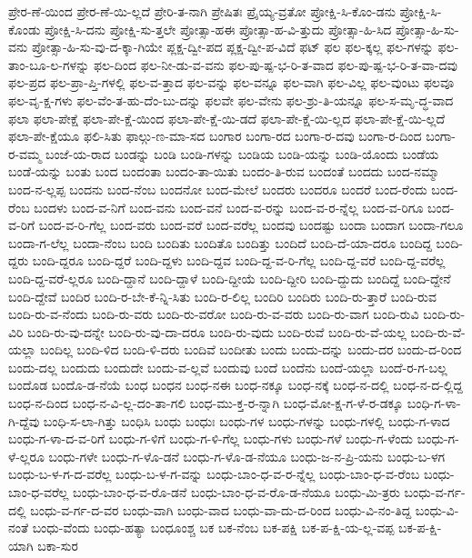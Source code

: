 {ಪ್ರೇರ-ಣೆ-ಯಿಂದ
ಪ್ರೇರ-ಣೆ-ಯಿ-ಲ್ಲದೆ
ಪ್ರೇರಿ-ತ-ನಾಗಿ
ಪ್ರೇಷಿತಃ
ಪ್ರೈಯ್ಯ-ವ್ರತೋ
ಪ್ರೋಕ್ಷಿ-ಸಿ-ಕೊಂ-ಡನು
ಪ್ರೋಕ್ಷಿ-ಸಿ-ಕೊಂಡು
ಪ್ರೋಕ್ಷಿ-ಸಿ-ದನು
ಪ್ರೋಕ್ಷಿ-ಸು-ತ್ತಲೇ
ಪ್ರೋತ್ಸಾ-ಹಈ
ಪ್ರೋತ್ಸಾ-ಹ-ವಿ-ತ್ತುದು
ಪ್ರೋತ್ಸಾ-ಹಿ-ಸಿದ
ಪ್ರೋತ್ಸಾ-ಹಿ-ಸು-ವನು
ಪ್ರೋತ್ಸಾ-ಹಿ-ಸು-ವು-ದ-ಕ್ಕಾ-ಗಿಯೇ
ಪ್ಲಕ್ಷ-ದ್ವೀ-ಪದ
ಪ್ಲಕ್ಷ-ದ್ವೀ-ಪ-ವಿದೆ
ಫಟ್
ಫಲ
ಫಲ-ಕ್ಕಲ್ಲ
ಫಲ-ಗಳನ್ನು
ಫಲ-ತಾಂ-ಬೂ-ಲ-ಗಳನ್ನು
ಫಲ-ದಿಂದ
ಫಲ-ನೀ-ಡು-ವ-ವನು
ಫಲ-ಪು-ಷ್ಪ-ಭ-ರಿ-ತ-ವಾದ
ಫಲ-ಪು-ಷ್ಪ-ಭ-ರಿ-ತ-ವಾ-ದವು
ಫಲ-ಪ್ರದ
ಫಲ-ಪ್ರಾ-ಪ್ತಿ-ಗಳಲ್ಲಿ
ಫಲ-ವ-ತ್ತಾದ
ಫಲ-ವನ್ನು
ಫಲ-ವನ್ನೂ
ಫಲ-ವಾಗಿ
ಫಲ-ವಿಲ್ಲ
ಫಲ-ವುಂಟು
ಫಲವೂ
ಫಲ-ವೃ-ಕ್ಷ-ಗಳು
ಫಲ-ವೆಂ-ತ-ಹು-ದೆಂ-ಬು-ದನ್ನು
ಫಲವೇ
ಫಲ-ವೇನು
ಫಲ-ಶ್ರು-ತಿ-ಯನ್ನೂ
ಫಲ-ಸ-ಮೃ-ದ್ಧ-ವಾದ
ಫಲಾ
ಫಲಾ-ಪೇಕ್ಷೆ
ಫಲಾ-ಪೇ-ಕ್ಷೆ-ಯಿಂದ
ಫಲಾ-ಪೇ-ಕ್ಷೆ-ಯಿ-ಡದೆ
ಫಲಾ-ಪೇ-ಕ್ಷೆ-ಯಿ-ಲ್ಲದ
ಫಲಾ-ಪೇ-ಕ್ಷೆ-ಯಿ-ಲ್ಲದೆ
ಫಲಾ-ಪೇ-ಕ್ಷೆಯೂ
ಫಲಿ-ಸಿತು
ಫಾಲ್ಗು-ಣ-ಮಾ-ಸದ
ಬಂಗಾರ
ಬಂಗಾ-ರದ
ಬಂಗಾ-ರ-ದವು
ಬಂಗಾ-ರ-ದಿಂದ
ಬಂಗಾ-ರ-ವಮ್ಮ
ಬಂಜೆ-ಯ-ರಾದ
ಬಂಡನ್ನು
ಬಂಡಿ
ಬಂಡಿ-ಗಳನ್ನು
ಬಂಡಿಯ
ಬಂಡಿ-ಯನ್ನು
ಬಂಡಿ-ಯೊಂದು
ಬಂಡೆಯ
ಬಂಡೆ-ಯನ್ನು
ಬಂತು
ಬಂದ
ಬಂದಂತಾ
ಬಂದಂ-ತಾ-ಯಿತು
ಬಂದಂ-ತಿ-ರುವ
ಬಂದಂತೆ
ಬಂದದು
ಬಂದ-ನಮ್ಮಾ
ಬಂದ-ನ-ಲ್ಲಪ್ಪ
ಬಂದನು
ಬಂದ-ನೆಂಬ
ಬಂದನೋ
ಬಂದ-ಮೇಲೆ
ಬಂದರು
ಬಂದರೂ
ಬಂದರೆ
ಬಂದ-ರೆಂದು
ಬಂದ-ರೆಂಬ
ಬಂದಳು
ಬಂದ-ವ-ನಿಗೆ
ಬಂದ-ವನು
ಬಂದ-ವನೆ
ಬಂದ-ವ-ರನ್ನು
ಬಂದ-ವ-ರ-ನ್ನೆಲ್ಲ
ಬಂದ-ವ-ರಿಗೂ
ಬಂದ-ವ-ರಿಗೆ
ಬಂದ-ವ-ರಿ-ಗೆಲ್ಲ
ಬಂದ-ವರು
ಬಂದ-ವರೆ
ಬಂದ-ವರೆಲ್ಲ
ಬಂದವು
ಬಂದಷ್ಟು
ಬಂದಾ
ಬಂದಾಗ
ಬಂದಾ-ಗಲೂ
ಬಂದಾ-ಗ-ಲೆಲ್ಲ
ಬಂದಾ-ನೆಂಬ
ಬಂದಿ
ಬಂದಿತು
ಬಂದಿತೊ
ಬಂದಿತ್ತು
ಬಂದಿದೆ
ಬಂದಿ-ದೆ-ಯಾ-ದರೂ
ಬಂದಿದ್ದ
ಬಂದಿ-ದ್ದರು
ಬಂದಿ-ದ್ದರೂ
ಬಂದಿ-ದ್ದರೆ
ಬಂದಿ-ದ್ದಳು
ಬಂದಿ-ದ್ದವ
ಬಂದಿ-ದ್ದ-ವ-ರಿ-ಗೆಲ್ಲ
ಬಂದಿ-ದ್ದ-ವರೆ
ಬಂದಿ-ದ್ದ-ವರೆಲ್ಲ
ಬಂದಿ-ದ್ದ-ವರೆ-ಲ್ಲರೂ
ಬಂದಿ-ದ್ದಾನೆ
ಬಂದಿ-ದ್ದಾಳೆ
ಬಂದಿ-ದ್ದೀಯೆ
ಬಂದಿ-ದ್ದೀರಿ
ಬಂದಿ-ದ್ದುದು
ಬಂದಿದ್ದೆ
ಬಂದಿ-ದ್ದೇನೆ
ಬಂದಿ-ದ್ದೇವೆ
ಬಂದಿರ
ಬಂದಿ-ರ-ಬೇ-ಕೆ-ನ್ನಿ-ಸಿತು
ಬಂದಿ-ರ-ಲಿಲ್ಲ
ಬಂದಿರಿ
ಬಂದಿರು
ಬಂದಿ-ರು-ತ್ತಾರೆ
ಬಂದಿ-ರುವ
ಬಂದಿ-ರು-ವ-ನೆಂದು
ಬಂದಿ-ರು-ವರು
ಬಂದಿ-ರು-ವರೋ
ಬಂದಿ-ರು-ವ-ವರು
ಬಂದಿ-ರು-ವಾಗ
ಬಂದಿ-ರುವಿ
ಬಂದಿ-ರು-ವಿರಿ
ಬಂದಿ-ರು-ವು-ದನ್ನೇ
ಬಂದಿ-ರು-ವು-ದಾ-ದರೂ
ಬಂದಿ-ರು-ವುದು
ಬಂದಿ-ರುವೆ
ಬಂದಿ-ರು-ವೆ-ಯಲ್ಲ
ಬಂದಿ-ರು-ವೆ-ಯಲ್ಲಾ
ಬಂದಿಲ್ಲ
ಬಂದಿ-ಳಿದ
ಬಂದಿ-ಳಿ-ದರು
ಬಂದಿವೆ
ಬಂದೀತು
ಬಂದು
ಬಂದು-ದನ್ನು
ಬಂದು-ದರ
ಬಂದು-ದ-ರಿಂದ
ಬಂದು-ದಲ್ಲ
ಬಂದುದು
ಬಂದುದೇ
ಬಂದು-ವ-ಲ್ಲವೆ
ಬಂದುವು
ಬಂದೆ
ಬಂದೆನು
ಬಂದೆ-ಯಲ್ಲಾ
ಬಂದೆ-ರ-ಗ-ಬಲ್ಲ
ಬಂದೊಡ
ಬಂದೊ-ಡ-ನೆಯೆ
ಬಂಧ
ಬಂಧನ
ಬಂಧ-ನಈ
ಬಂಧ-ನಕ್ಕೂ
ಬಂಧ-ನಕ್ಕೆ
ಬಂಧ-ನ-ದಲ್ಲಿ
ಬಂಧ-ನ-ದ-ಲ್ಲಿದ್ದ
ಬಂಧ-ನ-ದಿಂದ
ಬಂಧ-ನ-ವಿ-ಲ್ಲ-ದಂ-ತಾ-ಗಲಿ
ಬಂಧ-ಮು-ಕ್ತ-ರ-ನ್ನಾಗಿ
ಬಂಧ-ಮೋ-ಕ್ಷ-ಗ-ಳೆ-ರ-ಡಕ್ಕೂ
ಬಂಧಿ-ಗ-ಳಾ-ಗಿ-ದ್ದೆವು
ಬಂಧಿ-ಸ-ಲಾ-ಗಿತ್ತು
ಬಂಧಿಸಿ
ಬಂಧು
ಬಂಧುಃ
ಬಂಧು-ಗಳ
ಬಂಧು-ಗಳನ್ನು
ಬಂಧು-ಗಳಲ್ಲಿ
ಬಂಧು-ಗ-ಳಾದ
ಬಂಧು-ಗ-ಳಾ-ದ-ವ-ರಿಗೆ
ಬಂಧು-ಗ-ಳಿಗೆ
ಬಂಧು-ಗ-ಳಿ-ಗೆಲ್ಲ
ಬಂಧು-ಗಳು
ಬಂಧು-ಗಳೆ
ಬಂಧು-ಗ-ಳೆಂದು
ಬಂಧು-ಗ-ಳೆ-ಲ್ಲರೂ
ಬಂಧು-ಗಳೇ
ಬಂಧು-ಗ-ಳೊ-ಡನೆ
ಬಂಧು-ಗ-ಳೊ-ಡ-ನೆಯೂ
ಬಂಧು-ಜ-ನ-ಪ್ರಿ-ಯನು
ಬಂಧು-ಬ-ಳಗ
ಬಂಧು-ಬ-ಳ-ಗ-ದ-ವರೆಲ್ಲ
ಬಂಧು-ಬ-ಳ-ಗ-ವನ್ನು
ಬಂಧು-ಬಾಂ-ಧ-ವ-ರ-ನ್ನೆಲ್ಲ
ಬಂಧು-ಬಾಂ-ಧ-ವ-ರೆಂಬ
ಬಂಧು-ಬಾಂ-ಧ-ವರೆಲ್ಲ
ಬಂಧು-ಬಾಂ-ಧ-ವ-ರೊ-ಡನೆ
ಬಂಧು-ಬಾಂ-ಧ-ವ-ರೊ-ಡ-ನೆಯೂ
ಬಂಧು-ಮಿ-ತ್ರರು
ಬಂಧು-ವ-ರ್ಗ-ದಲ್ಲಿ
ಬಂಧು-ವ-ರ್ಗ-ದ-ವರ
ಬಂಧು-ವಾಗಿ
ಬಂಧು-ವಾದ
ಬಂಧು-ವಾ-ದು-ದ-ರಿಂದ
ಬಂಧು-ವಿ-ನಂ-ತಿದ್ದ
ಬಂಧು-ವಿ-ನಂತೆ
ಬಂಧು-ವೆಂದು
ಬಂಧು-ಹತ್ಯಾ
ಬಂಧೂಂಶ್ಚ
ಬಕ
ಬಕ-ನೆಂಬ
ಬಕ-ಪಕ್ಷಿ
ಬಕ-ಪ-ಕ್ಷಿ-ಯ-ಲ್ಲ-ವಪ್ಪ
ಬಕ-ಪ-ಕ್ಷಿ-ಯಾಗಿ
ಬಕಾ-ಸುರ
}
